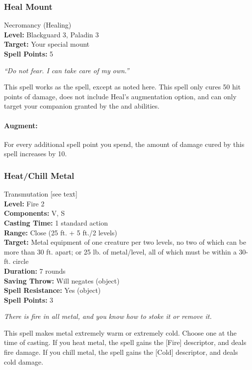 \subsubsection{Heal Mount}
\label{Spell:HealMount}
Necromancy (Healing)
\\ \textbf{Level:} Blackguard 3, Paladin 3
\\ \textbf{Target:} Your special mount
\\ \textbf{Spell Points:} 5

\emph{``Do not fear. I can take care of my own.''}

This spell works as the  spell, except as noted here. 
This spell only cures 50 hit points of damage, does not include Heal's augmentation option, and can only target your companion granted by the  and  abilities.

\paragraph{Augment:} For every additional spell point you spend, the amount of damage cured by this spell increases by 10.

\subsubsection{Heat/Chill Metal}
\label{Spell:HeatChillMetal}
Transmutation [see text]
\\ \textbf{Level:} Fire 2
\\ \textbf{Components:} V, S
\\ \textbf{Casting Time:} 1 standard action
\\ \textbf{Range:} Close (25 ft. + 5 ft./2 levels)
\\ \textbf{Target:} Metal equipment of one creature per two levels, no two of which can be more than 30 ft. apart; or 25 lb. of metal/level, all of which must be within a 30-ft. circle
\\ \textbf{Duration:} 7 rounds
\\ \textbf{Saving Throw:} Will negates (object)
\\ \textbf{Spell Resistance:} Yes (object)
\\ \textbf{Spell Points:} 3

\emph{There is fire in all metal, and you know how to stoke it or remove it.}

This spell makes metal extremely warm or extremely cold. 
Choose one at the time of casting.
If you heat metal, the spell gains the [Fire] descriptor, and deals fire damage.
If you chill metal, the spell gains the [Cold] descriptor, and deals cold damage.

